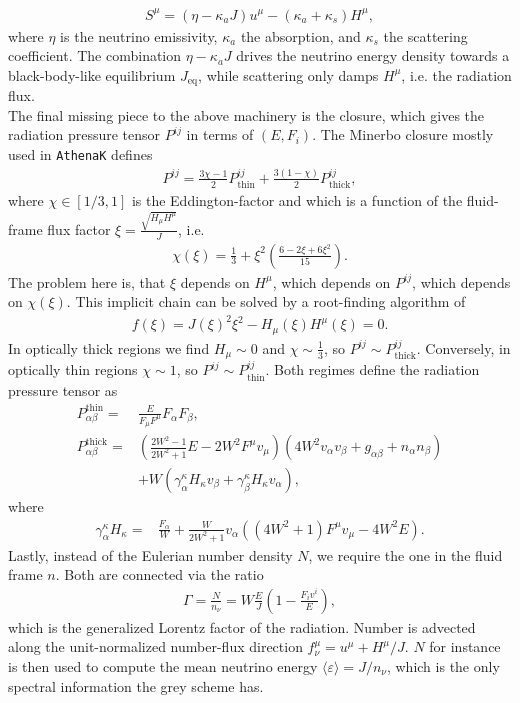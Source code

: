 \documentclass{article}
\begin{document}
\begin{align}\label{Equ:neutrinomatterS}
  S^{\mu}=(\eta-\kappa_aJ)u^{\mu}-(\kappa_a+\kappa_s)H^{\mu},
\end{align}
where $\eta$ is the neutrino emissivity, $\kappa_a$ the absorption, and $\kappa_s$ the scattering coefficient. The combination $\eta-\kappa_aJ$ drives
the neutrino energy density towards a black-body-like equilibrium $J_{\mathrm{eq}}$, while scattering only damps $H^{\mu}$, i.e. the radiation flux.\\
The final missing piece to the above machinery is the closure, which gives the radiation pressure tensor $P^{ij}$ in terms of $(E,F_i)$. The Minerbo closure mostly used in
\texttt{AthenaK} defines
\begin{align}
  P^{ij}=\frac{3\chi-1}{2}P^{ij}_{\mathrm{thin}}+\frac{3(1-\chi)}{2}P^{ij}_{\mathrm{thick}},\label{Equ:minerbo}
\end{align}
where $\chi\in[1/3,1]$ is the Eddington-factor and which is a function of the fluid-frame flux factor $\xi=\frac{\sqrt{H_{\mu}H^{\mu}}}{J}$, i.e.
\begin{align}
  \chi(\xi)=\frac{1}{3}+\xi^2\left(\frac{6-2\xi+6\xi^2}{15}\right).
\end{align}
The problem here is, that $\xi$ depends on $H^{\mu}$, which depends on $P^{ij}$, which depends on $\chi(\xi)$. This implicit chain can be
solved by a root-finding algorithm of
\begin{align}\label{Equ:rootequ}
  f(\xi)=J(\xi)^2\xi^2-H_{\mu}(\xi)H^{\mu}(\xi)=0.
\end{align}
In optically thick regions we find $H_{\mu}\sim0$ and $\chi\sim\frac{1}{3}$, so $P^{ij}\sim P^{ij}_{\mathrm{thick}}$. Conversely, in
optically thin regions $\chi\sim1$, so $P^{ij}\sim P^{ij}_{\mathrm{thin}}$. Both regimes define the radiation pressure tensor as
\begin{align}
  P_{\alpha\beta}^{\mathrm{thin}}=&\frac{E}{F_{\mu}F^{\mu}}F_{\alpha}F_{\beta},\label{Equ:Pthin}\\
  P_{\alpha\beta}^{\mathrm{thick}}=&\left(\frac{2W^2-1}{2W^2+1}E-2W^2F^{\mu}v_{\mu}\right)(4W^2v_{\alpha}v_{\beta}+g_{\alpha\beta}+n_{\alpha}n_{\beta})\nonumber\\
  &+W(\gamma^{\kappa}_{\alpha}H_{\kappa}v_{\beta}+\gamma^{\kappa}_{\beta}H_{\kappa}v_{\alpha}),\label{Equ:Pthick}
\end{align}
where
\begin{align}
  \gamma^{\kappa}_{\alpha}H_{\kappa}=&\frac{F_{\alpha}}{W}+\frac{W}{2W^2+1}v_{\alpha}((4W^2+1)F^{\mu}v_{\mu}-4W^2E).
\end{align}
Lastly, instead of the Eulerian number density $N$, we require the one in the fluid frame $n$. Both are connected via the ratio
\begin{align}
  \Gamma = \frac{N}{n_{\nu}}=W\frac{E}{J}\left(1-\frac{F_iv^i}{E}\right),
\end{align}
which is the generalized Lorentz factor of the radiation. Number is advected along the unit-normalized number-flux direction
$f^{\mu}_{\nu}=u^{\mu}+H^{\mu}/J$. $N$ for instance is then used to compute the mean neutrino energy $\langle \varepsilon\rangle =J/n_{\nu}$, which is the
only spectral information the grey scheme has.
\end{document}
